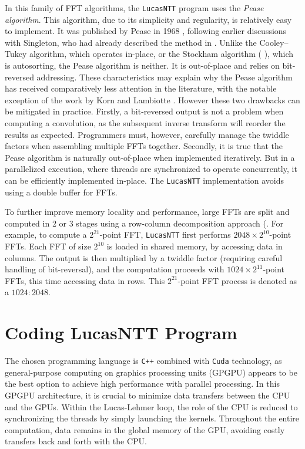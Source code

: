 \documentclass{article}
\begin{document}
In this family of FFT algorithms, the \texttt{LucasNTT} program uses the \textit{Pease algorithm}. This algorithm, due to its simplicity and regularity, is relatively easy to implement. It was published by Pease in 1968 \cite{Pea68}, following earlier discussions with Singleton, who had already described the method in \cite{Sin67a}. Unlike the Cooley–Tukey algorithm, which operates in-place, or the Stockham algorithm (\cite{Sto66} \cite{CCFHKLMNRW67}), which is autosorting, the Pease algorithm is neither. It is out-of-place and relies on bit-reversed addressing. These characteristics may explain why the Pease algorithm has received comparatively less attention in the literature, with the notable exception of the work by Korn and Lambiotte \cite{KL79}. However these two drawbacks can be mitigated in practice. Firstly, a bit-reversed output is not a problem when computing a convolution, as the subsequent inverse transform will reorder the results as expected. Programmers must, however, carefully manage the twiddle factors when assembling multiple FFTs together. Secondly, it is true that the Pease algorithm is naturally out-of-place when implemented iteratively. But in a parallelized execution, where threads are synchronized to operate concurrently, it can be efficiently implemented in-place. The \texttt{LucasNTT} implementation avoids using a double buffer for FFTs.

To further improve memory locality and performance, large FFTs are split and computed in 2 or 3 stages using a row-column decomposition approach (\cite{Bai89}. For example, to compute a $2^{21}$-point FFT, \texttt{LucasNTT} first performs $2048 \times 2^{10}$-point FFTs. Each FFT of size $2^{10}$ is loaded in shared memory, by accessing data in columns. The output is then multiplied by a twiddle factor (requiring careful handling of bit-reversal), and the computation proceeds with $1024 \times 2^{11}$-point FFTs, this time accessing data in rows. This $2^{21}$-point FFT process is denoted as a \texttt{$1024:2048$}.

\section{Coding LucasNTT Program}

The chosen programming language is \texttt{C++} combined with \texttt{Cuda} technology, as general-purpose computing on graphics processing units (GPGPU) appears to be the best option to achieve high performance with parallel processing. In this GPGPU architecture, it is crucial to minimize data transfers between the CPU and the GPUs. Within the Lucas-Lehmer loop, the role of the CPU is reduced to synchronizing the threads by simply launching the kernels. Throughout the entire computation, data remains in the global memory of the GPU, avoiding costly transfers back and forth with the CPU.
\end{document}
